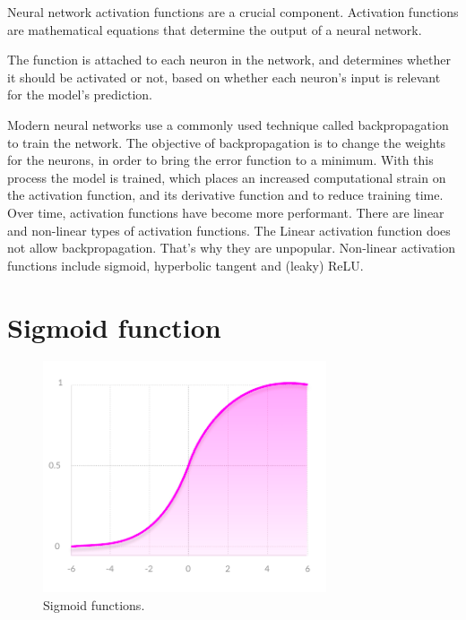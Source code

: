 \documentclass[a4paper,13pt,twoside]{book}
\begin{document}
Neural network activation functions are a crucial component.
Activation functions are mathematical equations that determine the output of a neural network.

The function is attached to each neuron in the network, and determines whether it should be activated or not, based on whether each neuron’s input is relevant for the model’s prediction.

Modern neural networks use a commonly used technique called backpropagation to train the network. The objective of backpropagation is to change the weights for the neurons, in order to bring the error function to a minimum. With this process the model is trained, which places an increased computational strain on the activation function, and its derivative function and to reduce training time. Over time, activation functions have become more performant. There are linear and non-linear types of activation functions. The Linear activation function does not allow backpropagation. That's why they are unpopular. Non-linear activation functions include sigmoid, hyperbolic tangent and (leaky) ReLU.

\section{Sigmoid function}

\begin{figure}[H]
  \includegraphics[width=\linewidth]{Images/sigmoid.png}
  \caption{Sigmoid functions.}
  \label{fig:Sigmoid Function}
\end{figure}
\end{document}
